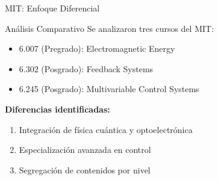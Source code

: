 \documentclass[aspectratio=43]{beamer}
\begin{document}
  \begin{frame}{MIT: Enfoque Diferencial}
  \begin{block}{Análisis Comparativo}
  Se analizaron tres cursos del MIT:
  \begin{itemize}
  \item 6.007 (Pregrado): Electromagnetic Energy
  \item 6.302 (Posgrado): Feedback Systems
  \item 6.245 (Posgrado): Multivariable Control Systems
  \end{itemize}
  \end{block}
  
  \pause
  
  \textbf{Diferencias identificadas:}
  \begin{enumerate}
  \item Integración de física cuántica y optoelectrónica
  \item Especialización avanzada en control
  \item Segregación de contenidos por nivel
  \end{enumerate}
  
  
  \end{frame}
  
\end{document}
